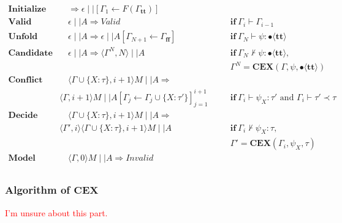 \documentclass[runningheads]{llncs}
\newcommand\COL{\mathbin{:}}
\newcommand \true {\textbf{tt}}
\newcommand \false {\textbf{ff}}
\newcommand \stypebool {\bullet}
\newcommand \typebool[1]{\stypebool \langle #1 \rangle}
\begin{document}
\begin{align*}
    \textbf{Initialize} &\quad
        \Longrightarrow
        \epsilon \mid \mid [\Gamma_1 \leftarrow F(\Gamma_\true)]
        &&\\
    \textbf{Valid} &\quad
        \epsilon \mid \mid A \Longrightarrow \textit{Valid}
        &&\quad \textbf{if} \ \Gamma_{i} \vdash \Gamma_{i-1}
        \\
    \textbf{Unfold} &\quad
        \epsilon \mid \mid A \Longrightarrow
        \epsilon \mid \mid A[\Gamma_{N+1} \leftarrow \Gamma_\false]
        &&\quad \textbf{if} \ \Gamma_{N} \vdash \psi: \typebool{\true}
        \\
    \textbf{Candidate} &\quad
        \epsilon \mid \mid A
        \Longrightarrow
        \langle \Gamma^N, N \rangle \mid \mid A
        && \quad \textbf{if} \ \Gamma_N \not \vdash \psi \COL
        \typebool{\true},\\
        &&&\quad \Gamma^N = \textbf{CEX}(\Gamma, \psi, \typebool{\true})
        \\
    \textbf{Conflict} &\quad
        \langle \Gamma \cup \{X: \tau\}, i + 1 \rangle M\mid \mid A
        \Longrightarrow&&\\
        & \langle \Gamma, i+1 \rangle M
        \mid \mid A[\Gamma_j \leftarrow \Gamma_j \cup \{X: \tau'\}]_{j=1}^{i+1}
        &&\quad \textbf{if} \  \Gamma_i \vdash \psi_X \COL \tau' \text{ and }
        \Gamma_i \vdash \tau' \prec \tau
        \\
    \textbf{Decide} &\quad
        \langle \Gamma \cup \{X: \tau\}, i + 1 \rangle M\mid \mid A
        \Longrightarrow&&\\
        & \langle \Gamma', i \rangle \langle \Gamma \cup \{X: \tau\}, i+1 \rangle M
        \mid \mid A
        &&\quad \textbf{if} \ \Gamma_i \not\vdash \psi_X \COL \tau,\\
        &&&\quad \Gamma' = \textbf{CEX}(\Gamma_i, \psi_X, \tau)
        \\
    \textbf{Model} &\quad
        \langle \Gamma, 0 \rangle M \mid \mid A \Rightarrow Invalid
        &&\\
\end{align*}




\subsubsection{Algorithm of \( \mathbf{CEX} \)}


\textcolor{red}{I'm unsure about this part.}
\end{document}
